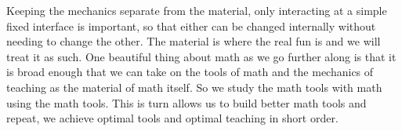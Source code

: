 \documentclass[12pt]{article}
\begin{document}
Keeping the mechanics separate from the material, only interacting at a simple fixed interface is important, so that either can be changed internally without needing to change the other.  The material
is where the real fun is and we will treat it as such.  One beautiful thing about math as we go further along is that it is broad enough that we can take on the tools of math and the mechanics of teaching
as the material of math itself.  So we study the math tools with math using the math tools.  This is turn allows us to build better math tools and repeat, we achieve optimal tools and optimal teaching in short order.
\end{document}
